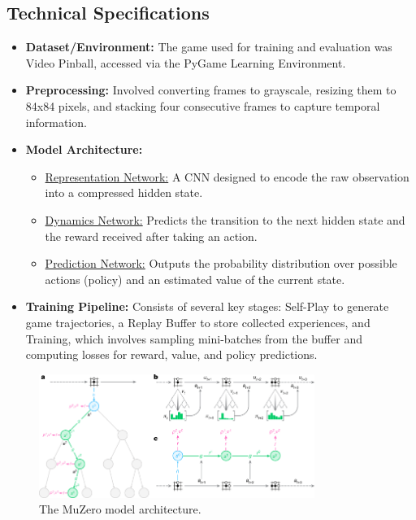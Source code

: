 \documentclass{article}
\begin{document}
\subsection{Technical Specifications}
\begin{itemize}
    \item \textbf{Dataset/Environment:} The game used for training and evaluation was Video Pinball, accessed via the PyGame Learning Environment.
    \item \textbf{Preprocessing:} Involved converting frames to grayscale, resizing them to 84x84 pixels, and stacking four consecutive frames to capture temporal information.
    \item \textbf{Model Architecture:}
    \begin{itemize}
        \item \underline{Representation Network:} A CNN designed to encode the raw observation into a compressed hidden state.
        \item \underline{Dynamics Network:} Predicts the transition to the next hidden state and the reward received after taking an action.
        \item \underline{Prediction Network:} Outputs the probability distribution over possible actions (policy) and an estimated value of the current state.
    \end{itemize}
    \item \textbf{Training Pipeline:} Consists of several key stages: Self-Play to generate game trajectories, a Replay Buffer to store collected experiences, and Training, which involves sampling mini-batches from the buffer and computing losses for reward, value, and policy predictions.
\end{itemize}

\begin{figure}[H]
    \centering
    \includegraphics[width=0.8\textwidth]{muzero.png}
    \caption{The MuZero model architecture.}
    \label{fig:muzuro}
\end{figure}
\end{document}
